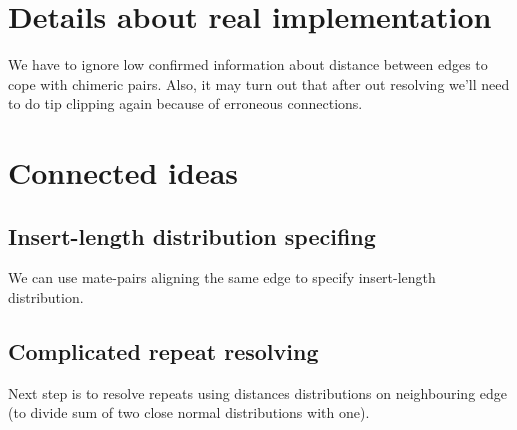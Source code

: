 \documentclass[12pt,a4paper,oneside]{article}
\begin{document}




\section{Details about real implementation}
We have to ignore low confirmed information about distance between edges to cope with chimeric pairs. Also, it may turn out that after out resolving we'll need to do tip clipping again because of erroneous connections.

\section{Connected ideas}
\subsection{Insert-length distribution specifing}
We can use mate-pairs aligning the same edge to specify insert-length distribution.
\subsection{Complicated repeat resolving}
Next step is to resolve repeats using distances distributions on neighbouring edge (to divide sum of two close normal distributions with one).
\end{document}
